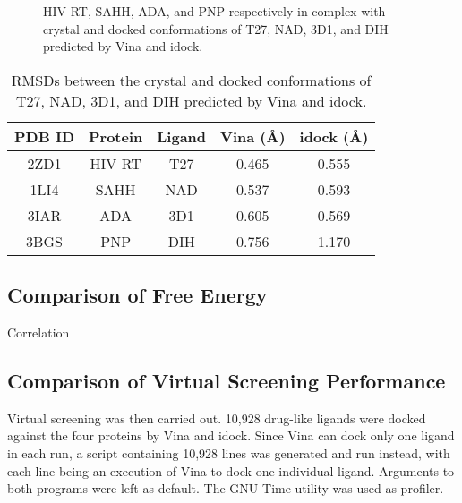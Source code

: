 \documentclass[10pt,conference,compsocconf]{../IEEEtran}
\begin{document}
\begin{figure*}
\centering
{}
\caption{HIV RT, SAHH, ADA, and PNP respectively in complex with crystal and docked conformations of T27, NAD, 3D1, and DIH predicted by Vina and idock.}
\label{fig:Redocking}
\end{figure*}

\begin{table}
\centering
\begin{tabular*}
{\linewidth}
{@{\extracolsep{\fill}}ccccc}
\toprule
PDB ID & Protein & Ligand & Vina (\AA) & idock (\AA)\\
\midrule
2ZD1 & HIV RT & T27 & 0.465 & 0.555\\
1LI4 & SAHH   & NAD & 0.537 & 0.593\\
3IAR & ADA    & 3D1 & 0.605 & 0.569\\
3BGS & PNP    & DIH & 0.756 & 1.170\\
\bottomrule
\end{tabular*}
\caption{RMSDs between the crystal and docked conformations of T27, NAD, 3D1, and DIH predicted by Vina and idock.}
\label{tab:RMSD}
\end{table}

\subsection{Comparison of Free Energy}

Correlation

\subsection{Comparison of Virtual Screening Performance}

Virtual screening was then carried out. 10,928 drug-like ligands were docked against the four proteins by Vina and idock. Since Vina can dock only one ligand in each run, a script containing 10,928 lines was generated and run instead, with each line being an execution of Vina to dock one individual ligand. Arguments to both programs were left as default. The GNU Time utility was used as profiler.
\end{document}
